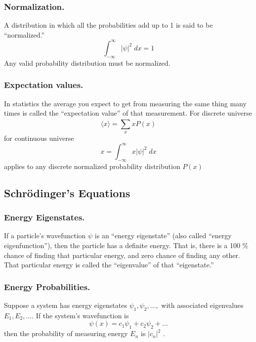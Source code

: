 \documentclass[../../../main.tex]{subfiles}
\begin{document}
\subsubsection{Normalization.} A distribution in which all the probabilities add up to 1 is said to be “normalized.” 
\begin{equation*}
    \int_{-\infty}^{\infty}|\psi|^2\;dx=1
\end{equation*}
Any valid probability distribution must be normalized.

\subsubsection{Expectation values.} In statistics the average you expect to get from measuring the same thing many times is called the “expectation value” of that measurement. For discrete universe
\begin{equation*}
    \langle x\rangle=\sum_{x}^{}xP(x)
\end{equation*}
for continuous universe
\begin{equation*}
    x=\int_{-\infty}^{\infty}x|\psi|^2\;dx
\end{equation*}
applies to any discrete normalized probability distribution $P(x)$

\subsection{Schrödinger's Equations }
\subsubsection{Energy Eigenstates.} If a particle's wavefunction $\psi$ is an “energy eigenstate” (also called “energy eigenfunction”), then the particle has a definite energy. That is, there is a 100 $\%$ chance of finding that particular energy, and zero chance of finding any other. That particular energy is called the “eigenvalue” of that “eigenstate.”

\subsubsection{Energy Probabilities.} Suppose a system has energy eigenstates $\psi_1 , \psi_2,\dots , $ with associated eigenvalues $E_1 ,E_2, \dots$. If the system's wavefunction is
\begin{equation*}
 \psi(x)=c_1\psi_1+c_2\psi_2+\dots
\end{equation*}
then the probability of measuring energy $E_n$ is $|c_n|^2$ .
\end{document}

